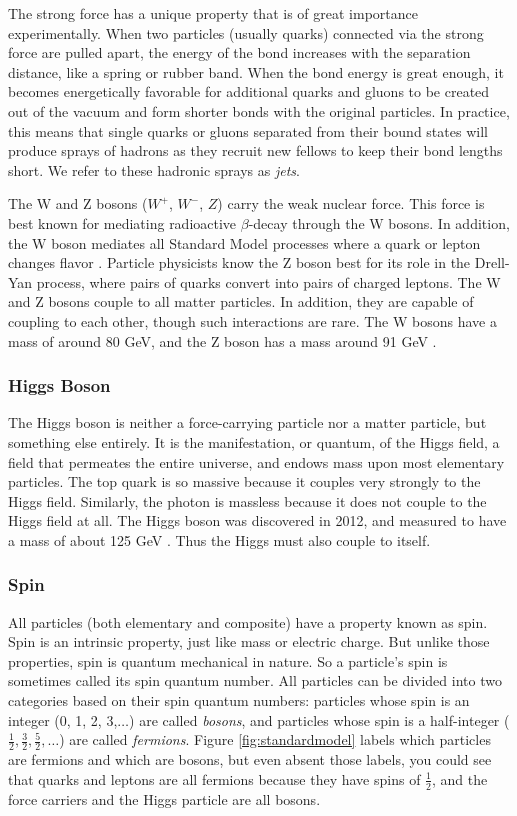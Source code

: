 The strong force has a unique property that is of great importance
experimentally. When two particles (usually quarks) connected via the
strong force are pulled apart, the energy of the bond increases with the separation
distance, like a spring or rubber band. When the bond energy is great
enough, it becomes energetically favorable for additional quarks and
gluons to be created out of the vacuum and form shorter bonds with the
original particles. In practice, this means that single quarks or
gluons separated from their bound states will produce sprays of
hadrons as they recruit new fellows to keep their bond lengths
short. We refer to these hadronic sprays as \emph{jets}.

The W and Z bosons ($W^+$, $W^-$, $Z$) carry the weak nuclear force. This
force is best known for mediating radioactive $\beta$-decay through
the W bosons. In addition, the W boson mediates all Standard Model
processes where a quark or lepton changes flavor \cite{griffiths}.
Particle physicists know the Z boson best for its
role in the Drell-Yan process, where pairs of quarks convert into
pairs of charged leptons. The W and Z bosons couple to all matter
particles. In addition, they are capable of coupling to each other,
though such interactions are rare. The W bosons have a mass of around
80 GeV, and the Z boson has a mass around 91 GeV \cite{pdg}.

\subsubsection*{Higgs Boson}
The Higgs boson is neither a force-carrying particle nor a matter particle, but
something else entirely. It is the manifestation, or quantum, of the
Higgs field, a field that permeates the entire universe, and endows
mass upon most elementary particles. The top quark is so massive
because it couples very strongly to the Higgs field. Similarly, the
photon is massless because it does not couple to the Higgs field at all.
The Higgs boson was discovered in 2012, and measured to have a mass
of about 125 GeV \cite{jointhiggs}. Thus the Higgs must also couple to itself.

\subsubsection*{Spin}
All particles (both elementary and composite) have
a property known as spin. Spin is an intrinsic property, just like
mass or electric charge. But unlike those properties, spin is quantum
mechanical in nature. So a particle's spin is sometimes called its
spin quantum number. All particles can be divided into two categories
based on their spin quantum numbers: particles whose spin is an
integer (0, 1, 2, 3,$\ldots$) are called \emph{bosons}, and particles whose
spin is a half-integer ($\frac{1}{2}, \frac{3}{2}, \frac{5}{2},\ldots$)
are called \emph{fermions}. Figure \ref{fig:standardmodel}
labels which particles are fermions and which are bosons, but even
absent those labels, you could see that quarks and leptons are all
fermions because they have spins of $\frac{1}{2}$, and the force
carriers and the Higgs particle are all bosons.

